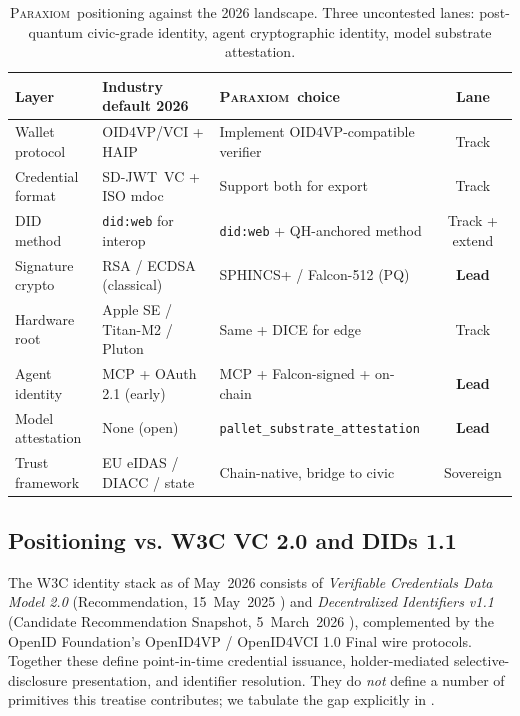 \documentclass[11pt,a4paper,parskip=half-,DIV=12,headings=standardclasses]{scrartcl}
\theoremstyle{ncthm}
\theoremstyle{ncdef}
\newcommand{\paraxiom}{\textsc{Paraxiom}}
\begin{document}
\begin{table}[h]
\centering
\small
\begin{tabular}{@{}lp{5cm}p{5cm}c@{}}
\toprule
\textsf{Layer} & \textsf{Industry default 2026} & \textsf{\paraxiom\ choice} & \textsf{Lane}\\
\midrule
Wallet protocol & OID4VP/VCI + HAIP & Implement OID4VP-compatible verifier & Track\\
Credential format & SD-JWT~VC + ISO mdoc & Support both for export & Track\\
DID method & \texttt{did:web} for interop & \texttt{did:web} + QH-anchored method & Track + extend\\
Signature crypto & RSA / ECDSA (classical) & SPHINCS+ / Falcon-512 (PQ) & \textbf{Lead}\\
Hardware root & Apple SE / Titan-M2 / Pluton & Same + DICE for edge & Track\\
Agent identity & MCP + OAuth 2.1 (early) & MCP + Falcon-signed + on-chain & \textbf{Lead}\\
Model attestation & None (open) & \texttt{pallet\_substrate\_attestation} & \textbf{Lead}\\
Trust framework & EU eIDAS / DIACC / state & Chain-native, bridge to civic & Sovereign\\
\bottomrule
\end{tabular}
\caption{\paraxiom\ positioning against the 2026 landscape. Three
uncontested lanes: post-quantum civic-grade identity, agent
cryptographic identity, model substrate attestation.}
\label{tab:positioning}
\end{table}

\subsection{Positioning vs. W3C VC 2.0 and DIDs 1.1}\label{subsec:w3c-positioning}

The W3C identity stack as of May~2026 consists of \emph{Verifiable
Credentials Data Model 2.0} (Recommendation, 15~May~2025
\cite{w3c-vcdm-2}) and \emph{Decentralized Identifiers v1.1}
(Candidate Recommendation Snapshot, 5~March~2026 \cite{w3c-did-1-1}),
complemented by the OpenID Foundation's OpenID4VP / OpenID4VCI 1.0
Final wire protocols. Together these define point-in-time credential
issuance, holder-mediated selective-disclosure presentation, and
identifier resolution. They do \emph{not} define a number of
primitives this treatise contributes; we tabulate the gap explicitly
in .
\end{document}
